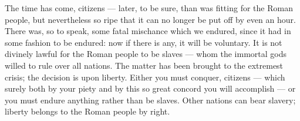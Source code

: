  The time has come, citizens --- later, to be sure, than was fitting for the Roman people, but nevertheless so ripe that it can no longer be put off by even an hour. There was, so to speak, some fatal mischance which we endured, since it had in some fashion to be endured: now if there is any, it will be voluntary. It is not divinely lawful for the Roman people to be slaves --- whom the immortal gods willed to rule over all nations. The matter has been brought to the extremest crisis; the decision is upon liberty. Either you must conquer, citizens --- which surely both by your piety and by this so great concord you will accomplish --- or you must endure anything rather than be slaves. Other nations can bear slavery; liberty belongs to the Roman people by right.
